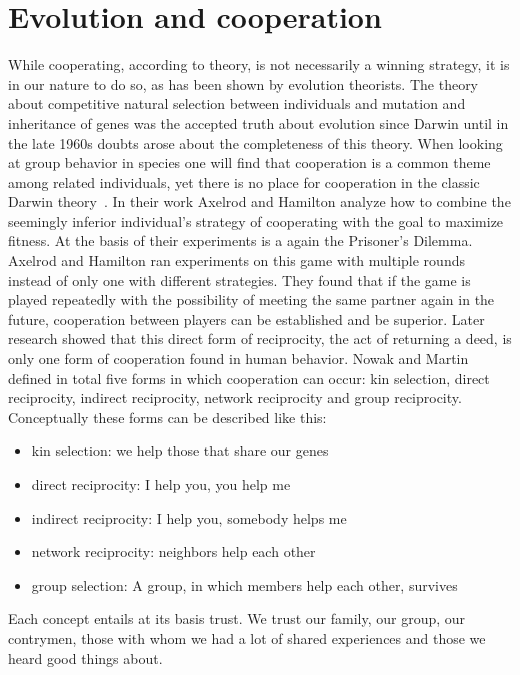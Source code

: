\section{Evolution and cooperation}
While cooperating, according to theory, is not necessarily a winning strategy, it is in our nature 
to do so, as has been shown by evolution theorists. The theory about competitive natural selection between individuals and mutation and inheritance of genes was the accepted truth about evolution since Darwin until in the late 1960s doubts arose about the completeness of this 
theory. When looking at group behavior in species one will find that cooperation is a common theme
among related individuals, yet there is no place for cooperation in the classic Darwin 
theory~\cite{Axelrod1390}. In their work Axelrod and Hamilton \cite{Axelrod1390} 
analyze how to combine the seemingly inferior individual's strategy of cooperating with the goal to 
maximize fitness. At the basis of their experiments is a again the Prisoner's 
Dilemma. Axelrod and Hamilton ran experiments on this game with multiple rounds instead of only one with
different strategies. They found that if the game is played repeatedly with the possibility of 
meeting the same partner again in the future, cooperation between players can be established and be
superior. Later research showed that this direct form of reciprocity, the act of returning a deed,
is only one form of cooperation found in human behavior. Nowak and 
Martin~\cite{nowak2006five} defined in total five forms in which cooperation can occur: kin selection, direct
reciprocity, indirect reciprocity, network reciprocity and group reciprocity. Conceptually these 
forms can be described like this:

\begin{itemize}
    \item kin selection: we help those that share our genes
    \item direct reciprocity: I help you, you help me
    \item indirect reciprocity: I help you, somebody helps me
    \item network reciprocity: neighbors help each other
    \item group selection: A group, in which members help each other, survives
\end{itemize}

Each concept entails at its basis trust. We trust our family, our group, our contrymen, those with whom we had a lot
of shared experiences and those we heard good things about. 

